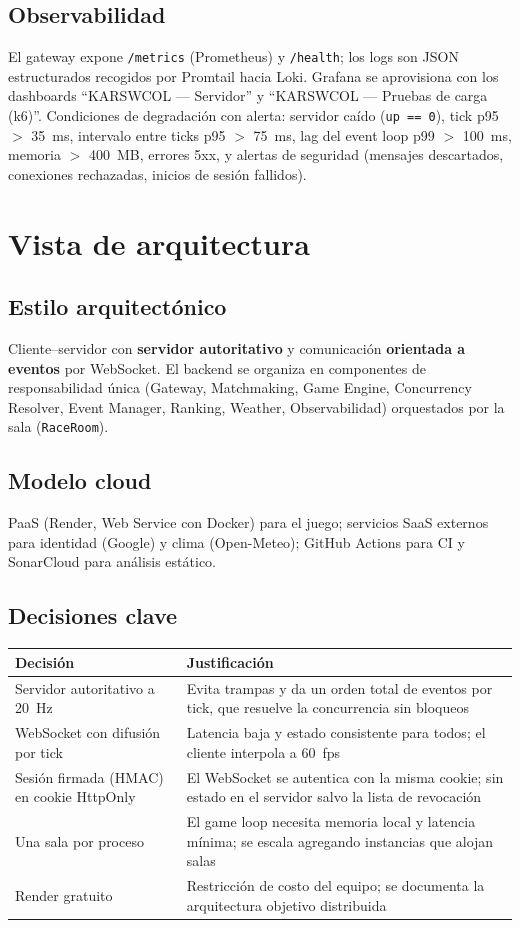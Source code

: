 \documentclass[11pt,a4paper]{article}
\begin{document}
\subsection{Observabilidad}
El gateway expone \texttt{/metrics} (Prometheus) y \texttt{/health}; los logs
son JSON estructurados recogidos por Promtail hacia Loki. Grafana se
aprovisiona con los dashboards ``KARSWCOL --- Servidor'' y ``KARSWCOL ---
Pruebas de carga (k6)''. Condiciones de degradación con alerta: servidor
caído (\texttt{up == 0}), tick p95 $>$ 35~ms, intervalo entre ticks p95 $>$
75~ms, lag del event loop p99 $>$ 100~ms, memoria $>$ 400~MB, errores 5xx, y
alertas de seguridad (mensajes descartados, conexiones rechazadas, inicios
de sesión fallidos).

\section{Vista de arquitectura}
\subsection{Estilo arquitectónico}
Cliente--servidor con \textbf{servidor autoritativo} y comunicación
\textbf{orientada a eventos} por WebSocket. El backend se organiza en
componentes de responsabilidad única (Gateway, Matchmaking, Game Engine,
Concurrency Resolver, Event Manager, Ranking, Weather, Observabilidad)
orquestados por la sala (\texttt{RaceRoom}).

\subsection{Modelo cloud}
PaaS (Render, Web Service con Docker) para el juego; servicios SaaS
externos para identidad (Google) y clima (Open-Meteo); GitHub Actions para
CI y SonarCloud para análisis estático.

\subsection{Decisiones clave}
\begin{tabularx}{\textwidth}{lL}
\toprule
\textbf{Decisión} & \textbf{Justificación}\\\midrule
Servidor autoritativo a 20~Hz & Evita trampas y da un orden total de eventos por tick, que resuelve la concurrencia sin bloqueos\\
WebSocket con difusión por tick & Latencia baja y estado consistente para todos; el cliente interpola a 60~fps\\
Sesión firmada (HMAC) en cookie HttpOnly & El WebSocket se autentica con la misma cookie; sin estado en el servidor salvo la lista de revocación\\
Una sala por proceso & El game loop necesita memoria local y latencia mínima; se escala agregando instancias que alojan salas\\
Render gratuito & Restricción de costo del equipo; se documenta la arquitectura objetivo distribuida\\
\bottomrule
\end{tabularx}
\end{document}

